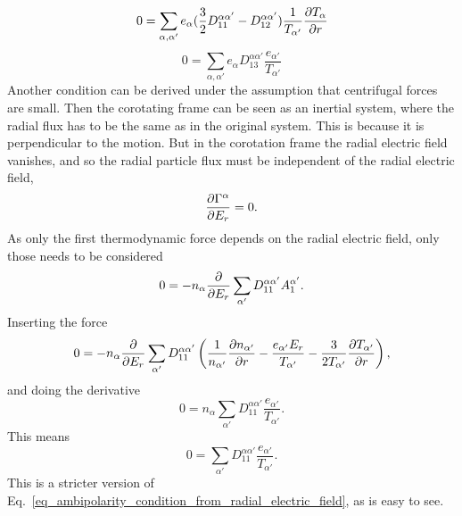 \begin{equation}
  0 = \sum_{\alpha, \alpha'} e_{\alpha} (\frac{3}{2} D_{11}^{\alpha\alpha'} - D_{12}^{\alpha\alpha'}) \frac{1}{T_{\alpha'}} \frac{\partial T_{\alpha}}{\partial r}
\end{equation}
\begin{equation}
  0 = \sum_{\alpha, \alpha'} e_{\alpha} D_{13}^{\alpha\alpha'} \frac{e_{\alpha'}}{T_{\alpha'}}
\end{equation}
Another condition can be derived under the assumption that centrifugal
forces are small. Then the corotating frame can be seen as an inertial
system, where the radial flux has to be the same as in the original
system. This is because it is perpendicular to the motion. But in the
corotation frame the radial electric field vanishes, and so the radial
particle flux must be independent of the radial electric field,
\begin{equation}
  \frac{\partial \Gamma^{\alpha}}{\partial E_r} = 0.
\end{equation}
As only the first thermodynamic force depends on the radial electric
field, only those needs to be considered
\begin{equation}
  0 = - n_{\alpha} \frac{\partial }{\partial E_r} \sum_{\alpha'} D_{11}^{\alpha\alpha'} A_1^{\alpha'}.
\end{equation}
Inserting the force
\begin{equation}
  0 = - n_{\alpha} \frac{\partial }{\partial E_r} \sum_{\alpha'} D_{11}^{\alpha\alpha'} \left( \frac{1}{n_{\alpha'}} \frac{\partial n_{\alpha'}}{\partial r} - \frac{e_{\alpha'} E_r}{T_{\alpha'}} - \frac{3}{2 T_{\alpha'}} \frac{\partial T_{\alpha'}}{\partial r} \right),
\end{equation}
and doing the derivative
\begin{equation}
  0 = n_{\alpha} \sum_{\alpha'} D_{11}^{\alpha\alpha'} \frac{e_{\alpha'}}{T_{\alpha'}}.
\end{equation}
This means
\begin{equation}
  0 = \sum_{\alpha'} D_{11}^{\alpha\alpha'} \frac{e_{\alpha'}}{T_{\alpha'}}.
\end{equation}
This is a stricter version of
Eq.~\eqref{eq_ambipolarity_condition_from_radial_electric_field}, as is
easy to see.
